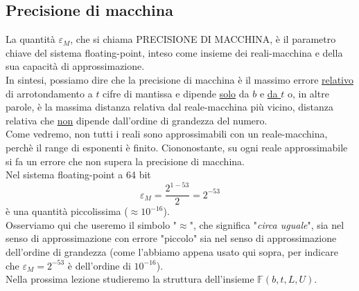 \documentclass[12pt]{article}
\begin{document}
\subsection*{Precisione di macchina}
La quantità $\varepsilon_M$, che si chiama PRECISIONE DI MACCHINA, è il parametro chiave del sistema floating-point, inteso come insieme dei reali-macchina e della sua capacità di approssimazione. \\
In sintesi, possiamo dire che la precisione di macchina è il massimo errore \underline{relativo} di arrotondamento a $t$ cifre di mantissa e dipende \underline{solo} da $b$ e \underline{da $t$} o, in altre parole, è la massima distanza relativa dal reale-macchina più vicino, distanza relativa che \underline{non} dipende dall'ordine di grandezza del numero. \\
Come vedremo, non tutti i reali sono approssimabili con un reale-macchina, perchè il range di esponenti è finito. Ciononostante, su ogni reale approssimabile si fa un errore che non supera la precisione di macchina. \\
Nel sistema floating-point a 64 bit \[ \varepsilon_M = \frac{2^{1-53}}{2} = 2^{-53}\] 
è una quantità piccolissima ($\approx 10^{-16}$). \\
Osserviamo qui che useremo il simbolo "$\approx$", che significa "\textit{circa uguale}", sia nel senso di approssimazione con errore "piccolo" sia nel senso di approssimazione dell'ordine di grandezza (come l'abbiamo appena usato qui sopra, per indicare che $\varepsilon_M = 2^{-53}$ è dell'ordine di $10^{-16}$). \\
Nella prossima lezione studieremo la struttura dell'insieme $\mathbb{F}(b, t, L, U)$.
\end{document}
